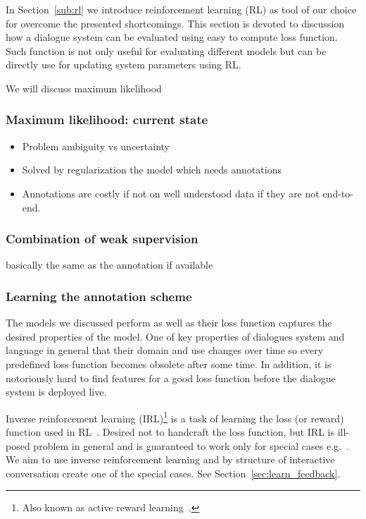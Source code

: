\documentclass[11pt]{article}
\begin{document}
In Section~\ref{sub:rl} we introduce reinforcement learning (RL) as tool of our choice for overcome the presented shortcomings.
This section is devoted to discussion how a dialogue system can be evaluated using easy to compute loss function.
Such function is not only useful for evaluating different models but can be directly use for updating system parameters using RL.

We will discuss maximum likelihood

\subsubsection*{Maximum likelihood: current state}\label{sub:maximum_likelihood}
\begin{itemize}
    \item Problem ambiguity vs uncertainty
    \item Solved by regularization the model which needs annotations
    \item Annotations are costly if not on well understood data if they are not end-to-end.
\end{itemize}

\subsubsection*{Combination of weak supervision}\label{sub:batch_rl}
basically the same as the annotation if available


\subsubsection*{Learning the annotation scheme}\label{sub:irl}
The models we discussed perform as well as their loss function captures the desired properties of the model.
One of key properties of dialogues system and language in general that their domain and use changes over time so every predefined loss function becomes obsolete after some time.
In addition, it is notoriously hard to find features for a good loss function before the dialogue system is deployed live.

Inverse reinforcement learning (IRL)\footnote{Also known as active reward learning~\cite{su2016active}.} is a task of learning the loss (or reward) function used in RL~\cite{abbeel_apprenticeship_2004}.
Desired not to handcraft the loss function, but IRL is ill-posed problem in general and is guaranteed to work only for special cases e.g.~\cite{abbeel_apprenticeship_2004}.
We aim to use inverse reinforcement learning and by structure of interactive conversation create one of the special cases.
See Section~\ref{sec:learn_feedback}.
\end{document}
